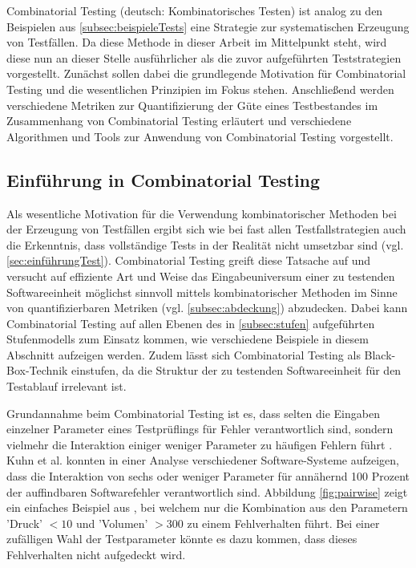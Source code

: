 Combinatorial Testing (deutsch: Kombinatorisches Testen) ist analog zu den Beispielen aus \autoref{subsec:beispieleTests} eine Strategie zur systematischen Erzeugung von Testfällen. Da diese Methode in dieser Arbeit im Mittelpunkt steht, wird diese nun an dieser Stelle ausführlicher als die zuvor aufgeführten Teststrategien vorgestellt. Zunächst sollen dabei die grundlegende Motivation für Combinatorial Testing und die wesentlichen Prinzipien im Fokus stehen. Anschließend werden verschiedene Metriken zur Quantifizierung der Güte eines Testbestandes im Zusammenhang von Combinatorial Testing erläutert und verschiedene Algorithmen und Tools zur Anwendung von Combinatorial Testing vorgestellt.

\subsection{Einführung in Combinatorial Testing}\label{subsec:einführungCombinatorial}

Als wesentliche Motivation für die Verwendung kombinatorischer Methoden bei der Erzeugung von Testfällen ergibt sich wie bei fast allen Testfallstrategien auch die Erkenntnis, dass vollständige Tests in der Realität nicht umsetzbar sind (vgl. \autoref{sec:einführungTest}). Combinatorial Testing greift diese Tatsache auf und versucht auf effiziente Art und Weise das Eingabeuniversum einer zu testenden Softwareeinheit möglichst sinnvoll mittels kombinatorischer Methoden im Sinne von quantifizierbaren Metriken (vgl. \autoref{subsec:abdeckung}) abzudecken. Dabei kann Combinatorial Testing auf allen Ebenen des in \autoref{subsec:stufen} aufgeführten Stufenmodells zum Einsatz kommen, wie verschiedene Beispiele in diesem Abschnitt aufzeigen werden. Zudem lässt sich Combinatorial Testing als Black-Box-Technik einstufen, da die Struktur der zu testenden Softwareeinheit für den Testablauf irrelevant ist.

Grundannahme beim Combinatorial Testing ist es, dass selten die Eingaben einzelner Parameter eines Testprüflings für Fehler verantwortlich sind, sondern vielmehr die Interaktion einiger weniger Parameter zu häufigen Fehlern führt \cite{kuhn2010practical}. Kuhn et al. \cite{kuhn2004error} konnten in einer Analyse verschiedener Software-Systeme aufzeigen, dass die Interaktion von sechs oder weniger Parameter für annähernd 100 Prozent der auffindbaren Softwarefehler verantwortlich sind. Abbildung \ref{fig:pairwise} zeigt ein einfaches Beispiel aus \cite{kuhn2010practical}, bei welchem nur die Kombination aus den Parametern 'Druck' $< 10$ und 'Volumen' $> 300$ zu einem Fehlverhalten führt. Bei einer zufälligen Wahl der Testparameter könnte es dazu kommen, dass dieses Fehlverhalten nicht aufgedeckt wird.

